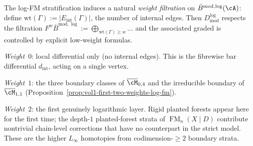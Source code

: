 \begin{construction}
\label{const:vol1-weight-filtration}
The log-FM stratification induces a natural \emph{weight filtration}
on $\bar{B}^{\mathrm{mod},\log}(\cA)$: define $\mathrm{wt}(\Gamma) :=
|E_{\mathrm{int}}(\Gamma)|$, the number of internal edges.  Then
$D^{\log}_{\mathrm{mod}}$ respects the filtration
$F^w \bar{B}^{\mathrm{mod},\log} :=
\bigoplus_{\mathrm{wt}(\Gamma) \geq w} \ldots$ and the
associated graded is controlled by explicit low-weight formulas.

\emph{Weight~$0$}: local differential only (no internal edges).
This is the fibrewise bar differential $d_{\mathrm{int}}$, acting
on a single vertex.

\emph{Weight~$1$}: the three boundary classes of
$\overline{\cM}_{0,4}$ and the irreducible boundary of
$\overline{\cM}_{1,1}$
(Proposition~\ref{prop:vol1-first-two-weights-log-fm}).

\emph{Weight~$2$}: the first genuinely logarithmic layer.  Rigid
planted forests appear here for the first time; the depth-$1$
planted-forest strata of $\operatorname{FM}_n(X \mathbin{|} D)$
contribute nontrivial chain-level corrections that have no
counterpart in the strict model.  These are the higher $L_\infty$
homotopies from codimension-${\geq}2$ boundary strata.
\end{construction}


